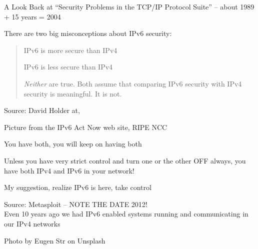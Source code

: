 \documentclass[Screen16to9,17pt]{foils}
\begin{document}
A Look Back at “Security Problems in the TCP/IP Protocol Suite” -- about 1989 + 15 years = 2004




There are two big misconceptions about IPv6 security:

\begin{quote}
\begin{list2}
\item IPv6 is more secure than IPv4
\item IPv6 is less secure than IPv4
\end{list2}

\emph{Neither} are true. Both assume that comparing IPv6 security with IPv4 security is meaningful. It is not.
\end{quote}
Source: David Holder at, 



Picture from the IPv6 Act Now web site, RIPE NCC

\begin{list2}
\item You have both, you will keep on having both
\item Unless you have very strict control and turn one or the other OFF always, you have both IPv4 and IPv6 in your network!
\item My suggestion, realize IPv6 is here, take control
\end{list2}



Source: Metasploit -- NOTE THE DATE 2012!\\
Even 10 years ago we had IPv6 enabled systems running and communicating in our IPv4 networks








\hfill Photo by Eugen Str on Unsplash




\end{document}
